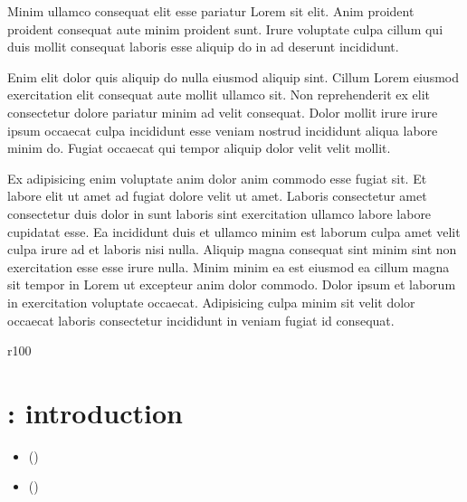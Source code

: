 \documentclass[a4paper,10pt,french]{sphinxmanual}
\let\sphinxpxdimen\pdfpxdimen\else\newdimen\sphinxpxdimen
\begin{document}
Minim ullamco consequat elit esse pariatur Lorem sit elit. Anim proident proident consequat aute minim proident sunt. Irure voluptate culpa cillum qui duis mollit consequat laboris esse aliquip do in ad deserunt incididunt.

Enim elit dolor quis aliquip do nulla eiusmod aliquip sint. Cillum Lorem eiusmod exercitation elit consequat aute mollit ullamco sit. Non reprehenderit ex elit consectetur dolore pariatur minim ad velit consequat. Dolor mollit irure irure ipsum occaecat culpa incididunt esse veniam nostrud incididunt aliqua labore minim do. Fugiat occaecat qui tempor aliquip dolor velit velit mollit.

Ex adipisicing enim voluptate anim dolor anim commodo esse fugiat sit. Et labore elit ut amet ad fugiat dolore velit ut amet. Laboris consectetur amet consectetur duis dolor in sunt laboris sint exercitation ullamco labore labore cupidatat esse. Ea incididunt duis et ullamco minim est laborum culpa amet velit culpa irure ad et laboris nisi nulla. Aliquip magna consequat sint minim sint non exercitation esse esse irure nulla. Minim minim ea est eiusmod ea cillum magna sit tempor in Lorem ut excepteur anim dolor commodo. Dolor ipsum et laborum in exercitation voluptate occaecat. Adipisicing culpa minim sit velit dolor occaecat laboris consectetur incididunt in veniam fugiat id consequat.
\label{\detokenize{docs/refs/autocad-intro:autocad-intro}}\begin{wrapfigure}{r}{100\sphinxpxdimen}
\centering
\noindent\sphinxincludegraphics[width=100\sphinxpxdimen]{{os-logos}.png}
\label{\detokenize{docs/refs/autocad-intro:autocad-intro}}\end{wrapfigure}


\chapter{ : introduction}
\label{\detokenize{docs/refs/autocad-intro::doc}}\label{\detokenize{docs/refs/autocad-intro:autodesk}}\label{\detokenize{docs/refs/autocad-intro:acad-introduction}}

\begin{sphinxShadowBox}
\begin{itemize}
\item {} 
\label{\detokenize{docs/refs/autocad-intro:id1}}{\hyperref[\detokenize{docs/refs/autocad-intro:resume}]{}} ()

\item {} 
\label{\detokenize{docs/refs/autocad-intro:id2}}{\hyperref[\detokenize{docs/refs/autocad-intro:premieres-realisations}]{}} ()

\end{itemize}
\end{sphinxShadowBox}
\end{document}

